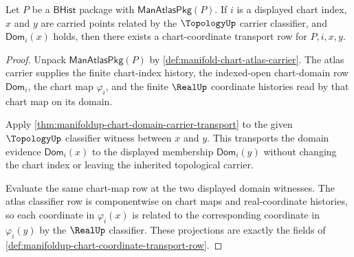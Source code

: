 \begin{theorem}
\label{thm:manifoldup-chart-coordinate-carrier-transport}
Let $P$ be a $\mathsf{BHist}$ package with $\mathsf{ManAtlasPkg}(P)$. If $i$
is a displayed chart index, $x$ and $y$ are carried points related by the
$\TopologyUp$ carrier classifier, and $\mathsf{Dom}_i(x)$ holds, then there
exists a chart-coordinate transport row for $P,i,x,y$.
\end{theorem}
\begin{proof}
Unpack $\mathsf{ManAtlasPkg}(P)$ by
\autoref{def:manifold-chart-atlas-carrier}. The atlas carrier supplies the
finite chart-index history, the indexed-open chart-domain row
$\mathsf{Dom}_i$, the chart map $\varphi_i$, and the finite $\RealUp$
coordinate histories read by that chart map on its domain.

Apply \autoref{thm:manifoldup-chart-domain-carrier-transport} to the given
$\TopologyUp$ classifier witness between $x$ and $y$. This transports the
domain evidence $\mathsf{Dom}_i(x)$ to the displayed membership
$\mathsf{Dom}_i(y)$ without changing the chart index or leaving the inherited
topological carrier.

Evaluate the same chart-map row at the two displayed domain witnesses. The
atlas classifier row is componentwise on chart maps and real-coordinate
histories, so each coordinate in $\varphi_i(x)$ is related to the corresponding
coordinate in $\varphi_i(y)$ by the $\RealUp$ classifier. These projections are
exactly the fields of
\autoref{def:manifoldup-chart-coordinate-transport-row}.
\end{proof}

